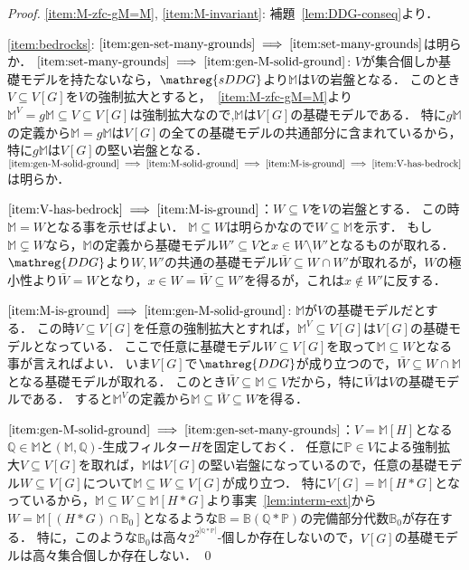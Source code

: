 \documentclass[a4j,leqno]{ltjsarticle}
\newcommand{\DDG}{\mathreg{DDG}}
\newcommand{\sDDG}{\mathreg{sDDG}}
\newcommand{\M}{\mathbb{M}}
\newcommand{\gM}{g\mathbb{M}}
\theoremstyle{nonumberplain}
\begin{document}
\begin{proof}
 \ref{item:M-zfc-gM=M}, \ref{item:M-invariant}: 補題~\ref{lem:DDG-conseq}より．

 \ref{item:bedrocks}: $\ref{item:gen-set-many-grounds} \implies \ref{item:set-many-grounds}$は明らか．
 $\ref{item:set-many-grounds} \implies \ref{item:gen-M-solid-ground}$:
 $V$が集合個しか基礎モデルを持たないなら，$\sDDG$より$\M$は$V$の岩盤となる．
 このとき$V \subseteq V[G]$を$V$の強制拡大とすると，~\ref{item:M-zfc-gM=M}より$\M^V = \gM \subseteq V \subseteq V[G]$は強制拡大なので,$\M$は$V[G]$の基礎モデルである．
 特に$\gM$の定義から$\M = \gM$は$V[G]$の全ての基礎モデルの共通部分に含まれているから，特に$\gM$は$V[G]$の堅い岩盤となる．
 $\ref{item:gen-M-solid-ground} \implies \ref{item:M-solid-ground} \implies \ref{item:M-is-ground} \implies \ref{item:V-has-bedrock}$は明らか．

 $\ref{item:V-has-bedrock} \implies \ref{item:M-is-ground}$：$W \subseteq V$を$V$の岩盤とする．
 この時$\M = W$となる事を示せばよい．
 $\M \subseteq W$は明らかなので$W \subseteq \M$を示す．
 もし$\M \subsetneq W$なら，$\M$の定義から基礎モデル$W' \subseteq V$と$x \in W \setminus W'$となるものが取れる．
 $\DDG$より$W, W'$の共通の基礎モデル$\bar{W} \subseteq W \cap W'$が取れるが，$W$の極小性より$\bar{W} = W$となり，$x \in W = \bar{W} \subseteq W'$を得るが，これは$x \notin W'$に反する．

 $\ref{item:M-is-ground} \implies \ref{item:gen-M-solid-ground}$: $\M$が$V$の基礎モデルだとする．
 この時$V \subseteq V[G]$を任意の強制拡大とすれば，$\M^V \subseteq V[G]$は$V[G]$の基礎モデルとなっている．
 ここで任意に基礎モデル$W \subseteq V[G]$を取って$\M \subseteq W$となる事が言えればよい．
 いま$V[G]$で$\DDG$が成り立つので，$\bar{W} \subseteq W \cap \M$となる基礎モデルが取れる．
 このとき$\bar{W} \subseteq \M \subseteq V$だから，特に$\bar{W}$は$V$の基礎モデルである．
 すると$\M^V$の定義から$\M \subseteq \bar{W} \subseteq W$を得る．

 $\ref{item:gen-M-solid-ground} \implies \ref{item:gen-set-many-grounds}$：$V = \M[H]$となる$\mathbb{Q} \in \M$と$(\M, \mathbb{Q})$-生成フィルター$H$を固定しておく．
 任意に$\mathbb{P} \in V$による強制拡大$V \subseteq V[G]$を取れば，$\M$は$V[G]$の堅い岩盤になっているので，任意の基礎モデル$W \subseteq V[G]$について$\M \subseteq W \subseteq V[G]$が成り立つ．
 特に$V[G] = \M[H \ast G]$となっているから，$\M \subseteq W \subseteq \M[H \ast G]$より事実~\ref{lem:interm-ext}から$W = \M[(H \ast G) \cap \mathbb{B}_0]$となるような$\mathbb{B} = \mathbb{B}(\mathbb{Q} \ast \mathbb{P})$の完備部分代数$\mathbb{B}_0$が存在する．
 特に，このような$\mathbb{B}_0$は高々$2^{2^{\left|\mathbb{Q} \ast\mathbb{P}\right|}}$-個しか存在しないので，$V[G]$の基礎モデルは高々集合個しか存在しない． \qed
\end{proof}
\end{document}
